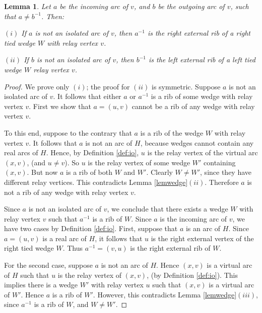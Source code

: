 \documentclass[12pt,letterpaper,oneside]{book}
\newtheorem{lemma}[theorem]{Lemma}
\begin{document}
\begin{lemma}\label{lemmaext} 
Let $a$ be the 
incoming arc of $v$, and $b$ be the outgoing arc of $v$, such that $a\ne b^{-1}$.  Then:
 
\noindent $(i)$ If $a$ is not an isolated arc of $v$, then $a^{-1}$ is the right external 
rib of a right tied wedge $W$ with relay vertex $v$. %

\noindent $(ii)$ If $b$ is not an isolated arc of $v$, then $b^{-1}$ is the left external 
rib of a left tied wedge $W$ relay vertex $v$.   %
\end{lemma} 
\begin{proof} 

We prove only $(i)$; the proof for $(ii)$ is symmetric.  
Suppose $a$ is not an isolated arc of $v$.  It follows that either $a$ or $a^{-1}$ is a rib of some wedge with relay vertex $v$.  
First we show that $a=(u,v)$ cannot be a rib of any wedge with relay vertex $v$.  

To this end, suppose to the contrary that $a$ is 
a rib of the wedge $W$ with relay vertex $v$.  It follows that $a$ is not an arc of $H$, because 
wedges cannot contain any real arcs of $H$.  Hence, by Definition \ref{def:io}, $u$ 
is the relay vertex of the virtual arc $(x,v)$, (and $u\ne v$).  So $u$ is the relay vertex of some wedge $W'$ containing $(x,v)$.   
But now $a$ is a rib of both $W$ and $W'$.  Clearly $W\ne W'$, since 
they have different relay vertices.  This contradicts Lemma \ref{lemwedge}$(ii)$.  Therefore $a$ is not a rib of any wedge with 
relay vertex $v$.


Since $a$ is not an isolated arc of $v$, we conclude that there exists a wedge $W$ with relay vertex $v$ such that $a^{-1}$ is a rib of $W$.  
Since $a$ is the incoming arc of $v$, we have two cases by Definition \ref{def:io}.  
First, suppose that $a$ is an arc of $H$.  
Since $a=(u,v)$ is a real arc of $H$, it follows that $u$ is the right external vertex of the right tied wedge $W$.  
Thus $a^{-1}=(v,u)$ is 
the right external rib of $W$.  %

For the second case, suppose $a$ is not an arc of $H$.  Hence $(x,v)$ is a virtual arc 
of $H$ such that $u$ is the relay vertex of $(x,v)$, (by Definition \ref{def:io}).  This implies there is a wedge $W'$ with 
relay vertex $u$ such that $(x,v)$ is a virtual arc of $W'$.  Hence $a$ is a rib of $W'$.  However, this 
contradicts Lemma \ref{lemwedge}$(iii)$, since $a^{-1}$ is a rib of $W$, and $W\ne W'$.   

\end{proof} 
 
\end{document}

